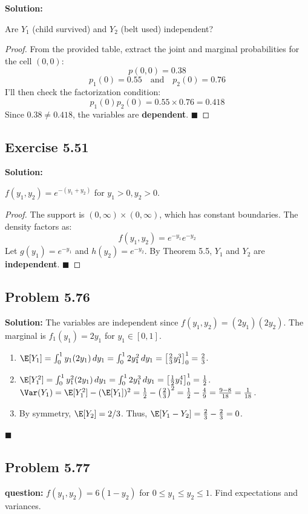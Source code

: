 \documentclass[11pt, letterpaper]{article}
\begin{document}
\textbf{Solution:} 

Are $Y_1$ (child survived) and $Y_2$ (belt used) independent?
\begin{proof}
From the provided table, extract the joint and marginal probabilities for the cell $(0,0)$:
\[ p(0,0) = 0.38 \]
\[ p_1(0) = 0.55 \quad \text{and} \quad p_2(0) = 0.76 \]
I'll then check the factorization condition:
\[ p_1(0)p_2(0) = 0.55 \times 0.76 = 0.418 \]
Since $0.38 \neq 0.418$, the variables are \textbf{dependent}. $\blacksquare$
\end{proof}

\subsection{Exercise 5.51}

\textbf{Solution:} 

$f(y_1, y_2) = e^{-(y_1+y_2)}$ for $y_1 > 0, y_2 > 0$.
\begin{proof}
The support is $(0, \infty) \times (0, \infty)$, which has constant boundaries. The density factors as:
\[ f(y_1, y_2) = e^{-y_1} e^{-y_2} \]
Let $g(y_1) = e^{-y_1}$ and $h(y_2) = e^{-y_2}$. By Theorem 5.5, $Y_1$ and $Y_2$ are \textbf{independent}. $\blacksquare$
\end{proof}

\subsection{Problem 5.76}
\textbf{Solution:}
The variables are independent since $f(y_1, y_2) = (2y_1)(2y_2)$. The marginal is $f_1(y_1) = 2y_1$ for $y_1 \in [0,1]$.
\begin{enumerate}[label=\alph*)]
    \item $\E[Y_1] = \int_0^1 y_1 (2y_1) \, dy_1 = \int_0^1 2y_1^2 \, dy_1 = \left[ \frac{2}{3}y_1^3 \right]_0^1 = \frac{2}{3}$.
    \item $\E[Y_1^2] = \int_0^1 y_1^2 (2y_1) \, dy_1 = \int_0^1 2y_1^3 \, dy_1 = \left[ \frac{1}{2}y_1^4 \right]_0^1 = \frac{1}{2}$. \\ \relax
    $\Var(Y_1) = \E[Y_1^2] - (\E[Y_1])^2 = \frac{1}{2} - \left(\frac{2}{3}\right)^2 = \frac{1}{2} - \frac{4}{9} = \frac{9 - 8}{18} = \frac{1}{18}$.
    \item By symmetry, $\E[Y_2] = 2/3$. Thus, $\E[Y_1 - Y_2] = \frac{2}{3} - \frac{2}{3} = 0$.
\end{enumerate}
\hfill $\blacksquare$


\subsection{Problem 5.77}
\textbf{question:} $f(y_1, y_2) = 6(1 - y_2)$ for $0 \leq y_1 \leq y_2 \leq 1$. Find expectations and variances.
\end{document}
